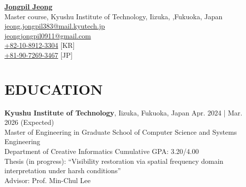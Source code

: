 \documentclass[a4paper,9pt]{extarticle}
\begin{document}
\pagestyle{fancy}
\renewcommand{\headrulewidth}{0pt}
\fancyhead{}
\thispagestyle{empty} %

\begin{flushleft}
\href{https://scholar.google.com/citations?user=O-3pYeQAAAAJ&hl=en}{\textbf{\LARGE Jongpil Jeong}}\\[2pt] %
Master course, Kyushu Institute of Technology, Iizuka, ,Fukuoka, Japan
\\ \href{mailto:jeong.jongpil383@mail.kyutech.jp}{jeong.jongpil383@mail.kyutech.jp} %
\\ \href{mailto:jeongjongpil0911@gmail.com}{jeongjongpil0911@gmail.com} %
\\ \href{tel:+82-10-8912-3304}{+82-10-8912-3304} [KR]
\\ \href{tel:+81-90-7269-3467}{+81-90-7269-3467} [JP]
\end{flushleft} 



\section*{EDUCATION}
\textbf{Kyushu Institute of Technology}, Iizuka, Fukuoka, Japan                         \hfill Apr. 2024 | Mar. 2026 (Expected)\\ %
Master of Engineering in Graduate School of Computer Science and Systems Engineering \\   
Department of Creative Informatics \hfill Cumulative GPA: 3.20/4.00 \\ %
Thesis (in progress): ``Visibility restoration via spatial frequency domain interpretation under harsh conditions''  \\
Advisor: Prof. Min-Chul Lee \\
\end{document}
